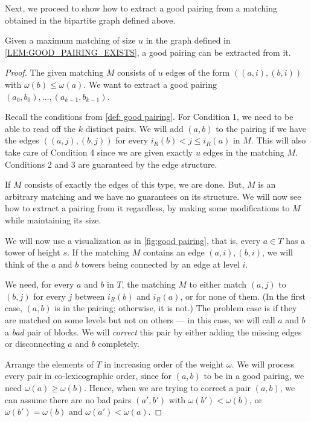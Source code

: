 \documentclass{article}
\begin{document}
	Next, we proceed to show how to extract a good pairing from a matching obtained in the bipartite graph defined above.
	
	\begin{claim} \label{clm: matching to good pairing}
		Given a maximum matching of size $u$ in the graph defined in \cref{LEM:GOOD_PAIRING_EXISTS}, a good pairing can be extracted from it. 
	\end{claim}
	
	\begin{proof}
		The given matching $M$ consists of $u$ edges of the form $((a, i), (b, i))$ with $\omega(b) \leq \omega(a)$. We want to extract a good pairing $(a_0, b_0), \dotsc, (a_{k-1}, b_{k-1})$.
		
		Recall the conditions from \cref{def: good pairing}. For Condition 1, we need to be able to read off the $k$ distinct pairs. We will add $(a, b)$ to the pairing if we have the edges $((a, j), (b, j))$ for every $i_R(b) < j \leq i_R(a)$ in $M$. This will also take care of Condition 4 since we are given exactly $u$ edges in the matching $M$. Conditions 2 and 3 are guaranteed by the edge structure.
		
		If $M$ consists of exactly the edges of this type, we are done. But, $M$ is an arbitrary matching and we have no guarantees on its structure. We will now see how to extract a pairing from it regardless, by making some modifications to $M$ while maintaining its size.
		
		We will now use a visualization as in \cref{fig:good pairing}, that is, every $a \in T$ has a tower of height $s$. If the matching $M$ contains an edge $(a, i), (b, i)$, we will think of the $a$ and $b$ towers being connected by an edge at level $i$.  
		
		We need, for every $a$ and $b$ in $T$, the matching $M$ to either match $(a, j)$ to $(b, j)$ for every $j$ between $i_R(b)$ and $i_R(a)$, or for none of them. (In the first case, $(a, b)$ is in the pairing; otherwise, it is not.)  The problem case is if they are matched on some levels but not on others --- in this case, we will call $a$ and $b$ a \emph{bad} pair of blocks. We will \emph{correct} this pair by either adding the missing edges or disconnecting $a$ and $b$ completely.
		
		Arrange the elements of $T$ in increasing order of the weight $\omega$. We will process every pair in co-lexicographic order, since for $(a, b)$ to be in a good pairing, we need $\omega(a) \geq \omega(b)$. Hence, when we are trying to correct a pair $(a, b)$, we can assume there are no bad pairs $(a', b')$ with $\omega(b') < \omega(b)$, or $\omega(b') = \omega(b)$ and $\omega(a') < \omega(a)$.
		

\end{proof}
\end{document}
